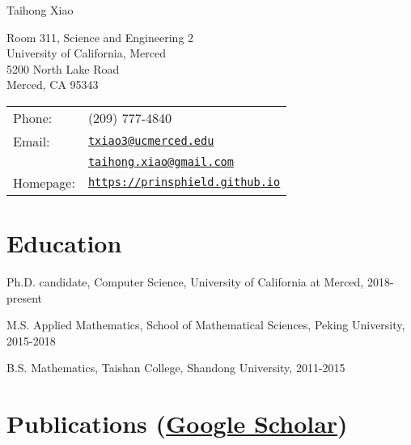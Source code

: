 \documentclass[letterpaper]{article}
\def\name{Taihong Xiao}
\renewenvironment{itemize}{
  \begin{list}{}{
    \setlength{\leftmargin}{1.5em}
  }
}{
  \end{list}
}
\begin{document}
{\huge \name}


\vspace{0.25in}

\begin{minipage}{0.45\linewidth}
	Room 311, Science and Engineering 2\\
	University of California, Merced\\
	5200 North Lake Road\\
	Merced, CA 95343
\end{minipage}
\begin{minipage}{0.45\linewidth}
  \begin{tabular}{ll}
    Phone:  & (209) 777-4840 \\
    Email:  & \href{mailto:txiao3@ucmerced.edu}{\tt txiao3@ucmerced.edu} \\
    		& \href{mailto:taihong.xiao@gmail.com}{\tt taihong.xiao@gmail.com}\\
    Homepage: & \href{https://prinsphield.github.io}{\tt https://prinsphield.github.io} \\
  \end{tabular}
\end{minipage}


\section*{Education}

\begin{itemize}

  \item Ph.D. candidate, Computer Science, University of California at Merced, 2018-present

  \item M.S. Applied Mathematics, School of Mathematical Sciences, Peking University, 2015-2018

  \item B.S. Mathematics, Taishan College, Shandong University, 2011-2015

\end{itemize}



\section*{Publications (\href{https://scholar.google.com/citations?user=Op_tr2IAAAAJ}{Google Scholar})}
\end{document}
